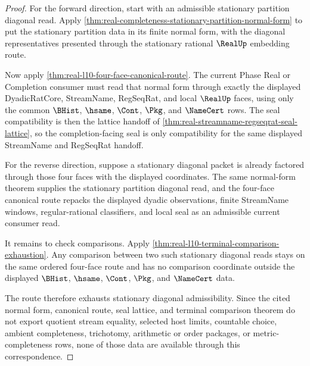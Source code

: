 \begin{proof}
For the forward direction, start with an admissible stationary partition diagonal read. Apply \autoref{thm:real-completeness-stationary-partition-normal-form} to put the stationary partition data in its finite normal form, with the diagonal representatives presented through the stationary rational $\RealUp$ embedding route.

Now apply \autoref{thm:real-l10-four-face-canonical-route}. The current Phase Real or Completion consumer must read that normal form through exactly the displayed DyadicRatCore, StreamName, RegSeqRat, and local $\RealUp$ faces, using only the common $\BHist$, $\hsame$, $\Cont$, $\Pkg$, and $\NameCert$ rows. The seal compatibility is then the lattice handoff of \autoref{thm:real-streamname-regseqrat-seal-lattice}, so the completion-facing seal is only compatibility for the same displayed StreamName and RegSeqRat handoff.

For the reverse direction, suppose a stationary diagonal packet is already factored through those four faces with the displayed coordinates. The same normal-form theorem supplies the stationary partition diagonal read, and the four-face canonical route repacks the displayed dyadic observations, finite StreamName windows, regular-rational classifiers, and local seal as an admissible current consumer read.

It remains to check comparisons. Apply \autoref{thm:real-l10-terminal-comparison-exhaustion}. Any comparison between two such stationary diagonal reads stays on the same ordered four-face route and has no comparison coordinate outside the displayed $\BHist$, $\hsame$, $\Cont$, $\Pkg$, and $\NameCert$ data.

The route therefore exhausts stationary diagonal admissibility. Since the cited normal form, canonical route, seal lattice, and terminal comparison theorem do not export quotient stream equality, selected host limits, countable choice, ambient completeness, trichotomy, arithmetic or order packages, or metric-completeness rows, none of those data are available through this correspondence.
\end{proof}

